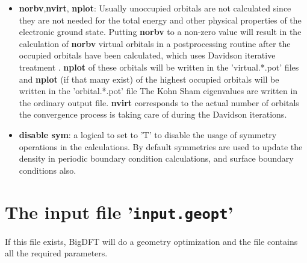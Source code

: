 \documentclass[a4paper,11pt]{report}
\begin{document}
\begin{itemize}
\item {\bf norbv},{\bf nvirt}, {\bf  nplot}: Usually unoccupied orbitals are not calculated since they are not needed for 
      the total energy and other physical properties of the electronic ground state. 
      Putting  {\bf norbv} to  a non-zero 
      value will result in the calculation of {\bf norbv} virtual orbitals in a postprocessing 
      routine after the occupied orbitals have been calculated, which uses Davidson iterative treatment . {\bf nplot}  of these 
      orbitals will be written in the 'virtual.*.pot' files and {\bf nplot} (if that many exist) 
      of the highest occupied orbitals will be  written in the 'orbital.*.pot' file
      The Kohn Sham eigenvalues are written in the ordinary output file.  {\bf nvirt} corresponds to the actual number of orbitals the convergence process is taking care of during the Davidson iterations.

\item \textbf{disable sym}: a logical to set to 'T' to disable the
      usage of symmetry operations in the calculations. By default symmetries
      are used to update the density in periodic boundary condition
      calculations, and surface boundary conditions also.
\end{itemize}

\section{The input file '\texttt{input.geopt}'}
If this file exists, BigDFT will do a geometry optimization and the file contains all the required parameters.
\end{document}
